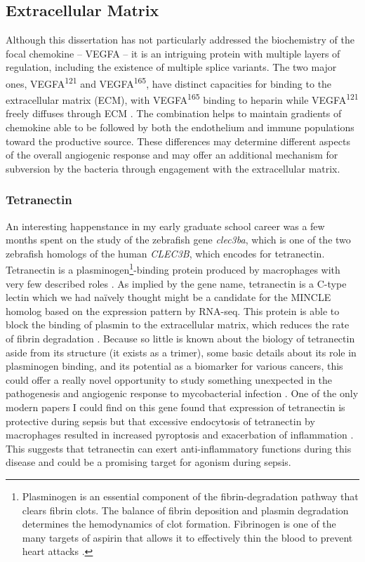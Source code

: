 \subsection{Extracellular Matrix}\label{ecm}

Although this dissertation has not particularly addressed the biochemistry of the focal chemokine -- VEGFA -- it is an intriguing protein with multiple layers of regulation, including the existence of multiple splice variants. The two major ones, VEGFA\textsuperscript{121} and VEGFA\textsuperscript{165}, have distinct capacities for binding to the extracellular matrix (ECM), with VEGFA\textsuperscript{165} binding to heparin while VEGFA\textsuperscript{121} freely diffuses through ECM \citep{Shibuya2011, Fearnley2016}. The combination helps to maintain gradients of chemokine able to be followed by both the endothelium and immune populations toward the productive source. These differences may determine different aspects of the overall angiogenic response and may offer an additional mechanism for subversion by the bacteria through engagement with the extracellular matrix. 

\subsubsection{Tetranectin}\label{clec3ba}

An interesting happenstance in my early graduate school career was a few months spent on the study of the zebrafish gene \textit{clec3ba}, which is one of the two zebrafish homologs of the human \textit{CLEC3B}, which encodes for tetranectin. Tetranectin is a plasminogen\footnote{Plasminogen is an essential component of the fibrin\hyp{}degradation pathway that clears fibrin clots. The balance of fibrin deposition and plasmin degradation determines the hemodynamics of clot formation. Fibrinogen is one of the many targets of aspirin that allows it to effectively thin the blood to prevent heart attacks \citep{Bjornsson1989, Keragala2021}.}\hyp{}binding protein produced by macrophages with very few described roles \citep{Nielsen1993}. As implied by the gene name, tetranectin is a C\hyp{}type lectin which we had na\"{i}vely thought might be a candidate for the MINCLE homolog based on the expression pattern by RNA\hyp{}seq. This protein is able to block the binding of plasmin to the extracellular matrix, which reduces the rate of fibrin degradation \citep{Mogues2004}. Because so little is known about the biology of tetranectin aside from its structure (it exists as a trimer), some basic details about its role in plasminogen binding, and its potential as a biomarker for various cancers, this could offer a really novel opportunity to study something unexpected in the pathogenesis and angiogenic response to mycobacterial infection \citep{Holtet1997, Nielsen1997, Graversen1998}. One of the only modern papers I could find on this gene found that expression of tetranectin is protective during sepsis but that excessive endocytosis of tetranectin by macrophages resulted in increased pyroptosis and exacerbation of inflammation \citep{Chen2020}. This suggests that tetranectin can exert anti\hyp{}inflammatory functions during this disease and could be a promising target for agonism during sepsis.

